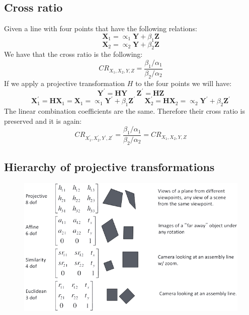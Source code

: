 \documentclass[12pt, a4paper]{report}
\begin{document}
    \subsection{Cross ratio}
    Given a line with four points that have the following relations: 
    \[\boldsymbol{X}_1=\propto_1\boldsymbol{Y}+\beta_1\boldsymbol{Z}\]
    \[\boldsymbol{X}_2=\propto_2\boldsymbol{Y}+\beta_2\boldsymbol{Z}\]
    We have that the cross ratio is the following: 
    \[CR_{X_1,X_2,Y,Z}=\dfrac{\beta_1/\alpha_1}{\beta_2/\alpha_2}\]
    If we apply a projective transformation $H$ to the four points we will have: 
    \[\boldsymbol{Y}^{'}=\boldsymbol{HY} \:\:\:\:\:\: \boldsymbol{Z}^{'}=\boldsymbol{HZ}\] 
    \[\boldsymbol{X}^{'}_1=\boldsymbol{HX}_1=\boldsymbol{X}_1=\propto_1\boldsymbol{Y}^{'}+\beta_1\boldsymbol{Z}^{'} \:\:\:\:\:\: \boldsymbol{X}^{'}_2=\boldsymbol{HX}_2=\propto_2\boldsymbol{Y}^{'}+\beta_2\boldsymbol{Z}^{'}\]
    The linear combination coefficients are the same. Therefore their cross ratio is preserved and it is again: 
    \[CR_{X_1^{'},X_2^{'},Y^{'},Z^{'}}=\dfrac{\beta_1/\alpha_1}{\beta_2/\alpha_2}=CR_{X_1,X_2,Y,Z}\]

    \subsection{Hierarchy of projective transformations}
    \begin{figure}[H]
        \centering
        \includegraphics[width=1\linewidth]{images/hierarchy.png}
    \end{figure}
\end{document}
